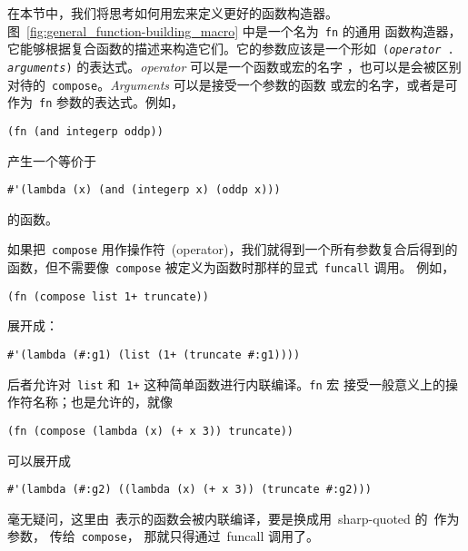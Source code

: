 在本节中，我们将思考如何用宏来定义更好的函数构造器。
图~\ref{fig:general_function-building_macro} 中是一个名为~\texttt{fn} 的通用
函数构造器，它能够根据复合函数的描述来构造它们。它的参数应该是一个形如~\texttt{(\emph{operator} .
\emph{arguments})} 的表达式。\emph{operator} 可以是一个函数或宏的名字
，也可以是会被区别对待的~\texttt{compose}。\emph{Arguments} 可以是接受一个参数的函数
或宏的名字，或者是可作为~\texttt{fn} 参数的表达式。例如，
\begin{lstlisting}
(fn (and integerp oddp))
\end{lstlisting}
产生一个等价于
\begin{lstlisting}
#'(lambda (x) (and (integerp x) (oddp x)))
\end{lstlisting}
的函数。

如果把~\texttt{compose} 用作操作符~(operator)，我们就得到一个所有参数复合后得到的
函数，但不需要像~\texttt{compose} 被定义为函数时那样的显式~\texttt{funcall} 调用。
例如，
\begin{lstlisting}
(fn (compose list 1+ truncate))
\end{lstlisting}
展开成：
\begin{lstlisting}
#'(lambda (#:g1) (list (1+ (truncate #:g1))))
\end{lstlisting}
后者允许对~\texttt{list} 和~\texttt{1+} 这种简单函数进行内联编译。\texttt{fn} 宏
接受一般意义上的操作符名称；\lexpr 也是允许的，就像
\begin{lstlisting}
(fn (compose (lambda (x) (+ x 3)) truncate))
\end{lstlisting}
可以展开成
\begin{lstlisting}
#'(lambda (#:g2) ((lambda (x) (+ x 3)) (truncate #:g2)))
\end{lstlisting}
毫无疑问，这里由~\lexpr 表示的函数会被内联编译，要是换成用~sharp-quoted 的~\lexpr 作为参数，
传给~\texttt{compose}， 那就只得通过~funcall 调用了。


